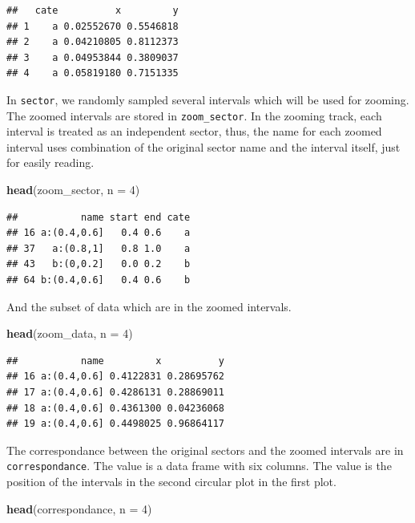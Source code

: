 \documentclass[]{book}
\newenvironment{Shaded}{\begin{snugshade}}{\end{snugshade}}
\newcommand{\KeywordTok}[1]{\textcolor[rgb]{0.13,0.29,0.53}{\textbf{#1}}}
\newcommand{\DataTypeTok}[1]{\textcolor[rgb]{0.13,0.29,0.53}{#1}}
\newcommand{\DecValTok}[1]{\textcolor[rgb]{0.00,0.00,0.81}{#1}}
\newcommand{\NormalTok}[1]{#1}
\theoremstyle{definition}
\theoremstyle{definition}
\theoremstyle{remark}
\begin{document}
\begin{verbatim}
##   cate          x         y
## 1    a 0.02552670 0.5546818
## 2    a 0.04210805 0.8112373
## 3    a 0.04953844 0.3809037
## 4    a 0.05819180 0.7151335
\end{verbatim}

In \texttt{sector}, we randomly sampled several intervals which will be
used for zooming. The zoomed intervals are stored in
\texttt{zoom\_sector}. In the zooming track, each interval is treated as
an independent sector, thus, the name for each zoomed interval uses
combination of the original sector name and the interval itself, just
for easily reading.

\begin{Shaded}
\begin{Highlighting}[]
\KeywordTok{head}\NormalTok{(zoom_sector, }\DataTypeTok{n =} \DecValTok{4}\NormalTok{)}
\end{Highlighting}
\end{Shaded}

\begin{verbatim}
##           name start end cate
## 16 a:(0.4,0.6]   0.4 0.6    a
## 37   a:(0.8,1]   0.8 1.0    a
## 43   b:(0,0.2]   0.0 0.2    b
## 64 b:(0.4,0.6]   0.4 0.6    b
\end{verbatim}

And the subset of data which are in the zoomed intervals.

\begin{Shaded}
\begin{Highlighting}[]
\KeywordTok{head}\NormalTok{(zoom_data, }\DataTypeTok{n =} \DecValTok{4}\NormalTok{)}
\end{Highlighting}
\end{Shaded}

\begin{verbatim}
##           name         x          y
## 16 a:(0.4,0.6] 0.4122831 0.28695762
## 17 a:(0.4,0.6] 0.4286131 0.28869011
## 18 a:(0.4,0.6] 0.4361300 0.04236068
## 19 a:(0.4,0.6] 0.4498025 0.96864117
\end{verbatim}

The correspondance between the original sectors and the zoomed intervals
are in \texttt{correspondance}. The value is a data frame with six
columns. The value is the position of the intervals in the second
circular plot in the first plot.

\begin{Shaded}
\begin{Highlighting}[]
\KeywordTok{head}\NormalTok{(correspondance, }\DataTypeTok{n =} \DecValTok{4}\NormalTok{)}
\end{Highlighting}
\end{Shaded}
\end{document}

